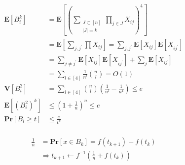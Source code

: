 \documentclass{article}
\newcommand{\prb}[1]{ \mathbf{Pr} \left[ {#1} \right]}
\newcommand{\expp}[1]{ \mathbf{E} \left[ {#1} \right]}
\begin{document}
\begin{multicols*}{2}
  \begin{equation*}
    \begin{split}
      \expp{B_{i}^{k} } &= \expp{ \left( \sum_{ \substack { J \subset [n] \\ |J| = k }  }{ \prod_{j \in J} { X_{ij} } } \right)^{4}  } \\
    &= \expp{ \sum_{j,j^{\prime}}{ \prod{X_{ij}}}}  
      = \sum_{ j,j^{\prime}}{ \expp{X_{ij}}\expp{X_{ij^{\prime}}}   } \\
      &=  \sum_{ j \neq j^{\prime} }{ \expp{X_{ij}}\expp{X_{ij^{\prime}}}   }  +
      \sum_{j}{ \expp{X_{ij}}}  \\
      &= \sum_{l \in [4] }\frac{1}{n^{l}} \binom{n}{l}  = O\left( 1 \right)  \\
      \mathbf{V}\left[ B_{i}^{2} \right] &= \sum_{ l \in [4]}{ \binom{n}{l} \left( \frac{1}{n^{l}} - \frac{1}{n^{4}} \right)  } \le e\\
      \expp{ \left( B_{i}^2 \right)^{k} } & \le \left( 1 + \frac{1}{n} \right)^{n} \le e \\ 
      \prb{ B_{i} \ge t} & \le \frac{e}{t^{k}}\\ 
    \end{split}
  \end{equation*}


  \begin{equation*}
    \begin{split}
      \frac{1}{n} &= \prb{ x \in B_{k} } = f\left( t_{k+1} \right)- f\left( t_{k} \right) \\
      & \Rightarrow t_{k+1} \leftarrow f^{-1}\left( \frac{1}{n} + f\left( t_{k} \right) \right) 
    \end{split}
  \end{equation*}



\end{multicols*}
\printbibliography 
\end{document}
